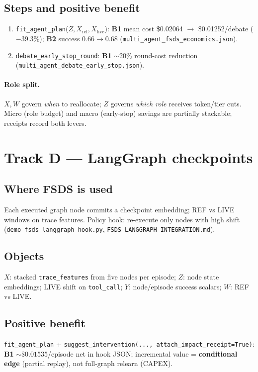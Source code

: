 \documentclass[11pt]{article}
\begin{document}
\subsection{Steps and positive benefit}
\begin{enumerate}[nosep]
  \item \texttt{fit\_agent\_plan}($Z,X_{\mathrm{ref}},X_{\mathrm{live}}$): \textbf{B1} mean cost \$0.02064 $\rightarrow$ \$0.01252/debate ($-39.3\%$); \textbf{B2} success $0.66\rightarrow 0.68$ (\texttt{multi\_agent\_fsds\_economics.json}).
  \item \texttt{debate\_early\_stop\_round}: \textbf{B1} $\sim$20\% round-cost reduction (\texttt{multi\_agent\_debate\_early\_stop.json}).
\end{enumerate}

\paragraph{Role split.}
$X,W$ govern \emph{when} to reallocate; $Z$ governs \emph{which role} receives token/tier cuts.
Micro (role budget) and macro (early-stop) savings are partially stackable; receipts record both levers.

\section{Track D --- LangGraph checkpoints}

\subsection{Where FSDS is used}
Each executed graph node commits a checkpoint embedding; REF vs LIVE windows on trace features.
Policy hook: re-execute only nodes with high shift (\texttt{demo\_fsds\_langgraph\_hook.py}, \texttt{FSDS\_LANGGRAPH\_INTEGRATION.md}).

\subsection{Objects}
$X$: stacked \texttt{trace\_features} from five nodes per episode; $Z$: node state embeddings; LIVE shift on \texttt{tool\_call}; $Y$: node/episode success scalars; $W$: REF vs LIVE.

\subsection{Positive benefit}
\texttt{fit\_agent\_plan} + \texttt{suggest\_intervention(..., attach\_impact\_receipt=True)}:
\textbf{B1} $\sim\$0.01535$/episode net in hook JSON; incremental value = \textbf{conditional edge} (partial replay), not full-graph relearn (CAPEX).
\end{document}
